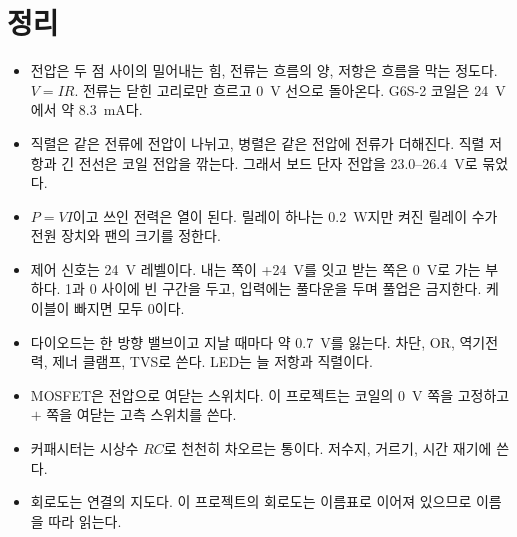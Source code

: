 \section{정리}

\begin{itemize}
\item 전압은 두 점 사이의 밀어내는 힘, 전류는 흐름의 양, 저항은 흐름을 막는 정도다. $V = IR$. 전류는 닫힌 고리로만
흐르고 0~V 선으로 돌아온다. G6S-2 코일은 24~V에서 약 8.3~mA다.
\item 직렬은 같은 전류에 전압이 나뉘고, 병렬은 같은 전압에 전류가 더해진다. 직렬 저항과 긴 전선은 코일 전압을 깎는다.
그래서 보드 단자 전압을 23.0--26.4~V로 묶었다.
\item $P = VI$이고 쓰인 전력은 열이 된다. 릴레이 하나는 0.2~W지만 켜진 릴레이 수가 전원 장치와 팬의 크기를 정한다.
\item 제어 신호는 24~V 레벨이다. 내는 쪽이 +24~V를 잇고 받는 쪽은 0~V로 가는 부하다. 1과 0 사이에 빈 구간을 두고,
입력에는 풀다운을 두며 풀업은 금지한다. 케이블이 빠지면 모두 0이다.
\item 다이오드는 한 방향 밸브이고 지날 때마다 약 0.7~V를 잃는다. 차단, OR, 역기전력, 제너 클램프, TVS로 쓴다.
LED는 늘 저항과 직렬이다.
\item MOSFET은 전압으로 여닫는 스위치다. 이 프로젝트는 코일의 0~V 쪽을 고정하고 $+$ 쪽을 여닫는 고측 스위치를 쓴다.
\item 커패시터는 시상수 $RC$로 천천히 차오르는 통이다. 저수지, 거르기, 시간 재기에 쓴다.
\item 회로도는 연결의 지도다. 이 프로젝트의 회로도는 이름표로 이어져 있으므로 이름을 따라 읽는다.
\end{itemize}

